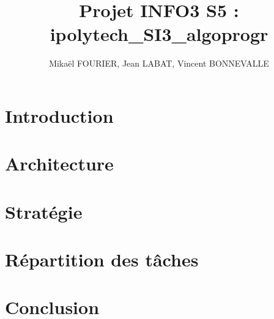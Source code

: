 \documentclass{rapport}
\title{Projet INFO3 S5 : ipolytech\_SI3\_algoprogr}
\author{%
	Mikaël FOURIER,
	Jean LABAT,
	Vincent BONNEVALLE
}
\date{}
\begin{document}
	\maketitle
	\tableofcontents
	\chapter*{Introduction}
	\chapter{Architecture}
	\chapter{Stratégie}
	\chapter{Répartition des tâches}
	\chapter*{Conclusion}
	\printindex
\end{document}
